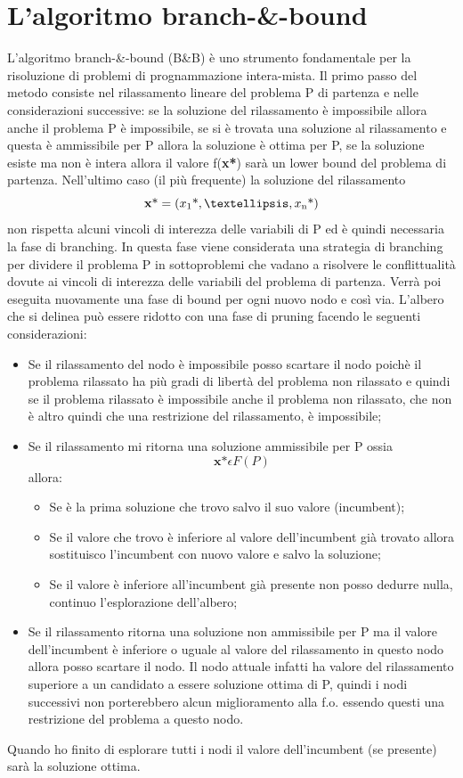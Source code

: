 \documentclass[12pt,a4paper,twoside,openright]{book}
\begin{document}
\section{L'algoritmo branch-\&-bound}
L'algoritmo branch-\&-bound (B\&B) è uno strumento fondamentale per la risoluzione di problemi di 
prognammazione intera-mista. Il primo passo del metodo consiste nel rilassamento lineare del problema P di partenza e nelle considerazioni
successive: se la soluzione del rilassamento è impossibile allora anche il problema P è impossibile, 
se si è trovata una soluzione al rilassamento e questa è ammissibile per P allora la 
soluzione è ottima per P, se la soluzione esiste ma non è intera allora il valore f(\textbf{x\textup{*}}) 
sarà un lower bound del problema di partenza.
Nell’ultimo caso (il più frequente) la soluzione del rilassamento \[\textbf{x}\textup{*} = 
(x \textsubscript{1} \textup{*}, …, x\textsubscript{n} \textup{*})\] non rispetta alcuni 
vincoli di interezza delle variabili di P ed è quindi necessaria la fase di branching.
In questa fase viene considerata una strategia di branching per dividere il problema P 
in sottoproblemi che vadano a risolvere le conflittualità dovute ai vincoli di interezza 
delle variabili del problema di partenza. Verrà poi eseguita nuovamente una 
fase di bound per ogni nuovo nodo e così via.
L’albero che si delinea può essere ridotto con una fase di pruning facendo le seguenti
considerazioni:
\begin{itemize}
    \item Se il rilassamento del nodo è impossibile posso scartare il nodo poichè
        il problema rilassato ha più gradi di libertà del problema non rilassato e
        quindi se il problema rilassato è impossibile anche il problema non rilassato, che
        non è altro quindi che una restrizione del rilassamento, è impossibile;
    \item Se il rilassamento mi ritorna una soluzione ammissibile per P ossia 
    \[\textbf{x*} \epsilon F(P)\] allora:
        \begin{itemize}
            \item Se è la prima soluzione che trovo salvo il suo valore (incumbent);
            \item Se il valore che trovo è inferiore al valore dell’incumbent già 
                trovato allora sostituisco l’incumbent con nuovo valore e salvo la 
                soluzione;
            \item Se il valore è inferiore all'incumbent già presente non posso dedurre nulla,
                continuo l'esplorazione dell'albero;
        \end{itemize}
    \item Se il rilassamento ritorna una soluzione non ammissibile per P ma il valore 
        dell’incumbent è inferiore o uguale al valore del rilassamento in questo nodo allora posso
        scartare il nodo. Il nodo attuale infatti ha valore del rilassamento superiore a un
        candidato a essere soluzione ottima di P, quindi i nodi successivi non porterebbero 
        alcun miglioramento alla f.o. essendo questi una restrizione del problema a questo nodo. 
\end{itemize}
Quando ho finito di esplorare tutti i nodi il valore dell’incumbent (se presente) sarà la soluzione ottima.
\end{document}
